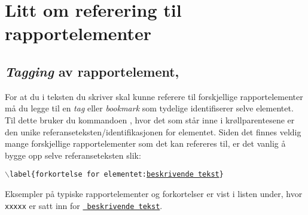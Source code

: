 
\chapter{Litt om referering til rapportelementer}\label{kap:referering}

\section{{\em Tagging} av rapportelement, }\label{delkap:label}
For at du i teksten du skriver 
skal kunne referere til forskjellige rapportelementer må du legge til en
{\em tag} eller {\em bookmark} som tydelige identifiserer selve
elementet. Til dette bruker du kommandoen 
, hvor det som står inne i
krøllparentesene er den unike referanseteksten/identifikasjonen for elementet.
Siden det finnes veldig mange forskjellige rapportelementer som det kan
refereres til, er det vanlig å bygge opp selve referanseteksten slik:\\[-10mm]
\begin{center}
  {\tt $\backslash$label\{forkortelse for elementet:\underline{beskrivende tekst}\}}
\end{center}
\vspace*{-5mm}
Eksempler på typiske rapportelementer og forkortelser  er
vist i listen under, hvor {\tt xxxxx} er satt inn for \underline{\tt
  beskrivende tekst}.
\vspace*{-3mm}
